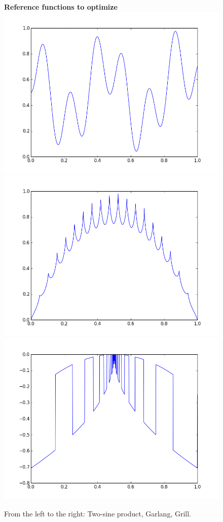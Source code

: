 \documentclass[a4paper,10pt]{article}
\begin{document}
\begin{figure}
\label{functions}
\centering
\textbf{Reference functions to optimize}\\
\includegraphics[scale=0.19]{sinprod.png}
\includegraphics[scale=0.19]{graland.png}
\includegraphics[scale=0.19]{grill.png}
\caption{From the left to the right: Two-sine product, Garlang, Grill.}
\end{figure}
\end{document}
